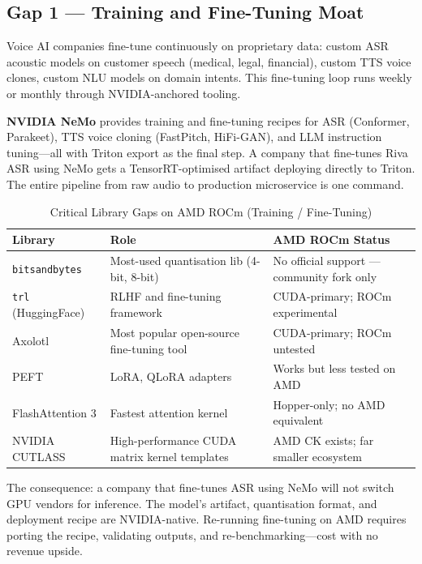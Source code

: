 \documentclass[12pt,a4paper]{article}
\begin{document}
\subsection{Gap 1 --- Training and Fine-Tuning Moat}

Voice AI companies fine-tune continuously on proprietary data: custom ASR
acoustic models on customer speech (medical, legal, financial), custom TTS
voice clones, custom NLU models on domain intents.  This fine-tuning loop
runs weekly or monthly through NVIDIA-anchored tooling.

\textbf{NVIDIA NeMo} provides training and fine-tuning recipes for ASR
(Conformer, Parakeet), TTS voice cloning (FastPitch, HiFi-GAN), and LLM
instruction tuning---all with Triton export as the final step.  A company
that fine-tunes Riva ASR using NeMo gets a TensorRT-optimised artifact
deploying directly to Triton.  The entire pipeline from raw audio to
production microservice is one command.

\begin{table}[H]\centering
\caption{Critical Library Gaps on AMD ROCm (Training / Fine-Tuning)}
\label{tab:lib-gaps}
\begin{tabularx}{\textwidth}{llX}
\toprule
\textbf{Library} & \textbf{Role} & \textbf{AMD ROCm Status} \\
\midrule
\texttt{bitsandbytes} & Most-used quantisation lib (4-bit, 8-bit) & No official support --- community fork only \\
\texttt{trl} (HuggingFace) & RLHF and fine-tuning framework & CUDA-primary; ROCm experimental \\
Axolotl & Most popular open-source fine-tuning tool & CUDA-primary; ROCm untested \\
PEFT & LoRA, QLoRA adapters & Works but less tested on AMD \\
FlashAttention 3 & Fastest attention kernel & Hopper-only; no AMD equivalent \\
NVIDIA CUTLASS & High-performance CUDA matrix kernel templates & AMD CK exists; far smaller ecosystem \\
\bottomrule
\end{tabularx}
\end{table}

The consequence: a company that fine-tunes ASR using NeMo will not switch
GPU vendors for inference.  The model's artifact, quantisation format, and
deployment recipe are NVIDIA-native.  Re-running fine-tuning on AMD requires
porting the recipe, validating outputs, and re-benchmarking---cost with no
revenue upside.
\end{document}
